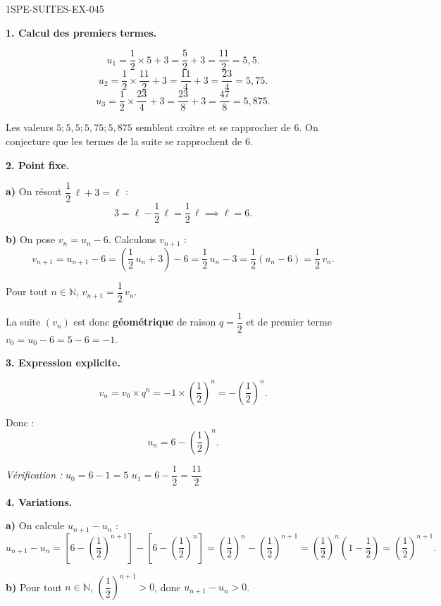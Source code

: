 \begin{corrige}{1SPE-SUITES-EX-045}

\textbf{1. Calcul des premiers termes.}

\[
u_1 = \frac{1}{2} \times 5 + 3 = \frac{5}{2} + 3 = \frac{11}{2} = 5{,}5.
\]
\[
u_2 = \frac{1}{2} \times \frac{11}{2} + 3 = \frac{11}{4} + 3 = \frac{23}{4} = 5{,}75.
\]
\[
u_3 = \frac{1}{2} \times \frac{23}{4} + 3 = \frac{23}{8} + 3 = \frac{47}{8} = 5{,}875.
\]

Les valeurs $5 ; 5{,}5 ; 5{,}75 ; 5{,}875$ semblent croître et se rapprocher de $6$. On conjecture que les termes de la suite se rapprochent de $6$.

\textbf{2. Point fixe.}


\textbf{a)} On résout $\dfrac{1}{2}\,\ell + 3 = \ell$ :
\[
3 = \ell - \frac{1}{2}\,\ell = \frac{1}{2}\,\ell \implies \ell = 6.
\]

\textbf{b)} On pose $v_n = u_n - 6$. Calculons $v_{n+1}$ :
\[
v_{n+1} = u_{n+1} - 6 = \left(\frac{1}{2}\,u_n + 3\right) - 6 = \frac{1}{2}\,u_n - 3 = \frac{1}{2}(u_n - 6) = \frac{1}{2}\,v_n.
\]

Pour tout $n \in \mathbb{N}$, $v_{n+1} = \dfrac{1}{2}\,v_n$.

La suite $(v_n)$ est donc \textbf{géométrique} de raison $q = \dfrac{1}{2}$ et de premier terme $v_0 = u_0 - 6 = 5 - 6 = -1$.

\textbf{3. Expression explicite.}

\[
v_n = v_0 \times q^n = -1 \times \left(\frac{1}{2}\right)^n = -\left(\frac{1}{2}\right)^n.
\]

Donc :
\[
\boxed{u_n = 6 - \left(\frac{1}{2}\right)^n}.
\]

\textit{Vérification :} $u_0 = 6 - 1 = 5$ \checkmark \quad $u_1 = 6 - \dfrac{1}{2} = \dfrac{11}{2}$ \checkmark

\textbf{4. Variations.}

\textbf{a)} On calcule $u_{n+1} - u_n$ :
\[
u_{n+1} - u_n = \left[6 - \left(\frac{1}{2}\right)^{n+1}\right] - \left[6 - \left(\frac{1}{2}\right)^n\right] = \left(\frac{1}{2}\right)^n - \left(\frac{1}{2}\right)^{n+1} = \left(\frac{1}{2}\right)^n \left(1 - \frac{1}{2}\right) = \left(\frac{1}{2}\right)^{n+1}.
\]

\textbf{b)} Pour tout $n \in \mathbb{N}$, $\left(\dfrac{1}{2}\right)^{n+1} > 0$, donc $u_{n+1} - u_n > 0$.


\end{corrige}
